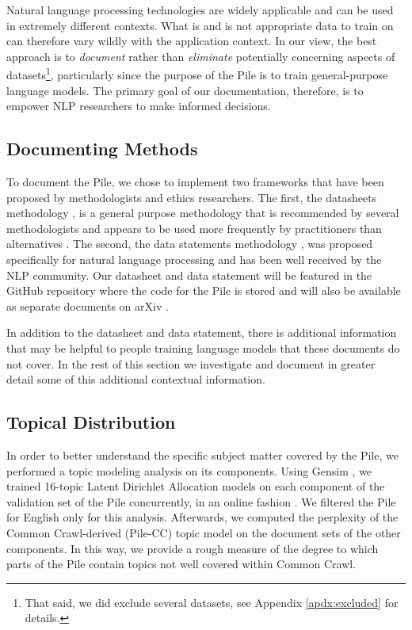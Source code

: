 \documentclass[11pt,a4paper]{article}
\begin{document}
Natural language processing technologies are widely applicable and can be used in extremely different contexts. What is and is not appropriate data to train on can therefore vary wildly with the application context. In our view, the best approach is to \textit{document} rather than \textit{eliminate} potentially concerning aspects of datasets\footnote{That said, we did exclude several datasets, see Appendix \ref{apdx:excluded} for details.}, particularly since the purpose of the Pile is to train general-purpose language models. The primary goal of our documentation, therefore, is to empower NLP researchers to make informed decisions.

\subsection{Documenting Methods}

To document the Pile, we chose to implement two frameworks that have been proposed by methodologists and ethics researchers. The first, the datasheets methodology \citep{datasheets}, is a general purpose methodology that is recommended by several methodologists \citep{best-practice1,best-practice2} and appears to be used more frequently by practitioners than alternatives \citep{datasheet1,datasheet2,datasheet3}. The second, the data statements methodology \citep{datastatement}, was proposed specifically for natural language processing and has been well received by the NLP community. Our datasheet and data statement will be featured in the GitHub repository where the code for the Pile is stored and will also be available as separate documents on arXiv \citep{pile-datasheet,pile-datastatement}.

In addition to the datasheet and data statement, there is additional information that may be helpful to people training language models that these documents do not cover. In the rest of this section we investigate and document in greater detail some of this additional contextual information.


\subsection{Topical Distribution}

In order to better understand the specific subject matter covered by the Pile, we performed a topic modeling analysis on its components. Using Gensim \citep{gensim}, we trained 16-topic Latent Dirichlet Allocation \citep{lda} models on each component of the validation set of the Pile concurrently, in an online fashion \citep{onlinelda}. We filtered the Pile for English only for this analysis. Afterwards, we computed the perplexity of the Common Crawl-derived (Pile-CC) topic model on the document sets of the other components. In this way, we provide a rough measure of the degree to which parts of the Pile contain topics not well covered within Common Crawl.
\end{document}
